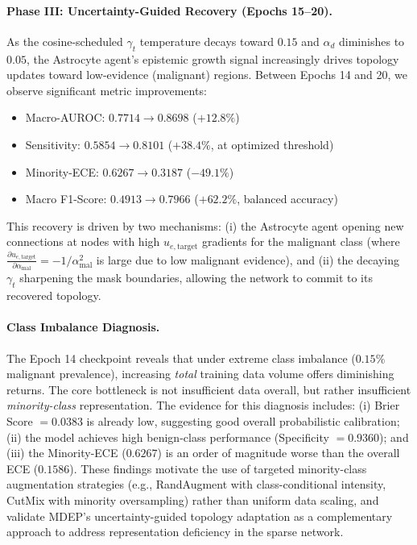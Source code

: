 \documentclass[letterpaper]{article} %
\begin{document}
\paragraph{Phase III: Uncertainty-Guided Recovery (Epochs 15--20).} As the cosine-scheduled $\gamma_t$ temperature decays toward $0.15$ and $\alpha_d$ diminishes to $0.05$, the Astrocyte agent's epistemic growth signal increasingly drives topology updates toward low-evidence (malignant) regions. Between Epochs 14 and 20, we observe significant metric improvements:
\begin{itemize}
    \item Macro-AUROC: $0.7714 \to 0.8698$ ($+12.8\%$)
    \item Sensitivity: $0.5854 \to 0.8101$ ($+38.4\%$, at optimized threshold)
    \item Minority-ECE: $0.6267 \to 0.3187$ ($-49.1\%$)
    \item Macro F1-Score: $0.4913 \to 0.7966$ ($+62.2\%$, balanced accuracy)
\end{itemize}
This recovery is driven by two mechanisms: (i) the Astrocyte agent opening new connections at nodes with high $u_{e,\text{target}}$ gradients for the malignant class (where $\frac{\partial u_{e,\text{target}}}{\partial \alpha_{\text{mal}}} = -1/\alpha_{\text{mal}}^2$ is large due to low malignant evidence), and (ii) the decaying $\gamma_t$ sharpening the mask boundaries, allowing the network to commit to its recovered topology.

\paragraph{Class Imbalance Diagnosis.} The Epoch 14 checkpoint reveals that under extreme class imbalance ($0.15\%$ malignant prevalence), increasing \emph{total} training data volume offers diminishing returns. The core bottleneck is not insufficient data overall, but rather insufficient \emph{minority-class} representation. The evidence for this diagnosis includes: (i) Brier Score $= 0.0383$ is already low, suggesting good overall probabilistic calibration; (ii) the model achieves high benign-class performance (Specificity $= 0.9360$); and (iii) the Minority-ECE ($0.6267$) is an order of magnitude worse than the overall ECE ($0.1586$). These findings motivate the use of targeted minority-class augmentation strategies (e.g., RandAugment with class-conditional intensity, CutMix with minority oversampling) rather than uniform data scaling, and validate MDEP's uncertainty-guided topology adaptation as a complementary approach to address representation deficiency in the sparse network.
\end{document}
